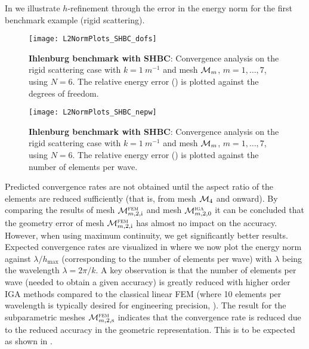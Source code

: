 In  we illustrate $h$-refinement through the error in the energy norm for the first benchmark example (rigid scattering).
\begin{figure}
	\centering
	\texttt{[image: L2NormPlots\_SHBC\_dofs]}
	\caption{\textbf{Ihlenburg benchmark with SHBC}: Convergence analysis on the rigid scattering case with $k=\SI{1}{m^{-1}}$ and mesh ${\cal M}_m$, $m=1,\dots,7$, using $N=6$. The relative energy error () is plotted against the degrees of freedom.}
	\label{Fig2:EnergyErrorPlotsDofs}
	\par\bigskip
	\texttt{[image: L2NormPlots\_SHBC\_nepw]}
	\caption{\textbf{Ihlenburg benchmark with SHBC}: Convergence analysis on the rigid scattering case with $k=\SI{1}{m^{-1}}$ and mesh ${\cal M}_m$, $m=1,\dots,7$, using $N=6$. The relative energy error () is plotted against the number of elements per wave.}
	\label{Fig2:EnergyErrorPlotsh}
\end{figure}
Predicted convergence rates are not obtained until the aspect ratio of the elements are reduced sufficiently (that is, from mesh ${\cal M}_4$ and onward). By comparing the results of mesh ${\cal M}_{m,2,\mathrm{i}}^{\textsc{fem}}$ and mesh ${\cal M}_{m,2,0}^{\textsc{iga}}$ it can be concluded that the geometry error of mesh ${\cal M}_{m,2,\mathrm{i}}^{\textsc{fem}}$ has almost no impact on the accuracy. However, when using maximum continuity, we get significantly better results. Expected convergence rates are visualized in  where we now plot the energy norm against $\lambda/h_{\mathrm{max}}$ (corresponding to the number of elements per wave) with $\lambda$ being the wavelength $\lambda=2\pi/k$. A key observation is that the number of elements per wave (needed to obtain a given accuracy) is greatly reduced with higher order IGA methods compared to the classical linear FEM (where 10 elements per wavelength is typically desired for engineering precision, \cite[p. 182]{Ihlenburg1998fea}). The result for the subparametric meshes ${\cal M}_{m,2,\mathrm{s}}^{\textsc{fem}}$ indicates that the convergence rate is reduced due to the reduced accuracy in the geometric representation. This is to be expected as shown in \cite[p. 202]{Strang1973aao}.

